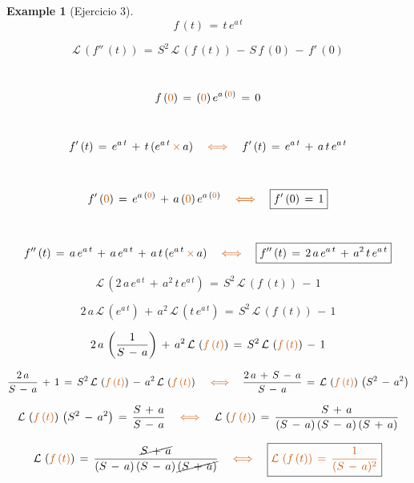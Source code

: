 \documentclass[a4paper,11pt,openany]{book}
\newtheorem{exmp}{Example}[section]
\begin{document}
\begin{exmp}[Ejercicio 3]
 
$$f\,(t)\,=\,t\,e^{a\,t}$$
 
 
$$\boxed{\mathcal{L}\,\left(f''\,(t) \right)\,=\,S^{2}\,\mathcal{L}\,\left(f\,(t) \right)\,-\,S\,f\,(0)\,-\,f'\,(0)}$$
 
\textcolor{burntorange}{}\, $$f\,(\textcolor{burntorange}{0})\,=\,(\textcolor{burntorange}{0})\,e^{a\,(\textcolor{burntorange}{0})}\,=\,0$$
 
\textcolor{burntorange}{}\, $$f'\,(t)\,=\,e^{a\,t}\,+\,t\,(e^{a\,t}\,\textcolor{burntorange}{\times}\,a) \quad \textcolor{burntorange}{\iff} \quad f'\,(t)\,=\,e^{a\,t}\,+\,a\,t\,e^{a\,t}$$
 
\textcolor{burntorange}{}\, $$f'\,(\textcolor{burntorange}{0})\,=\,e^{a\,(\textcolor{burntorange}{0})}\,+\,a\,(\textcolor{burntorange}{0})\,e^{a\,(\textcolor{burntorange}{0})} \quad \textcolor{burntorange}{\iff} \quad \boxed{f'\,(0)\,=\,1}$$
 
\textcolor{burntorange}{}\, $$f''\,(t)\,=\,a\,e^{a\,t}\,+\,a\,e^{a\,t}\,+\,a\,t\,(e^{a\,t}\,\textcolor{burntorange}{\times}\,a) \quad \textcolor{burntorange}{\iff} \quad \boxed{f''\,(t)\,=\,2\,a\,e^{a\,t}\,+\,a^{2}\,t\,e^{a\,t}}$$
 
$$\mathcal{L}\,\left(2\,a\,e^{a\,t}\,+\,a^{2}\,t\,e^{a\,t} \right)\,=\,S^{2}\,\mathcal{L}\,\left(f\,(t) \right)\,-\,1$$
 
$$2\,a\,\mathcal{L}\,\left(e^{a\,t} \right)\,+\,a^{2}\,\mathcal{L}\,\left(t\,e^{a\,t} \right)\,=\,S^{2}\,\mathcal{L}\,\left(f\,(t) \right)\,-\,1$$
 
$$2\,a\,\left(\dfrac{1}{S\,-\,a} \right)\,+\,a^{2}\,\mathcal{L}\,\left(\textcolor{burntorange}{f\,(t) } \right)\,=\,S^{2}\,\mathcal{L}\,\left(\textcolor{burntorange}{f\,(t) } \right)\,-\,1 $$
 
$$\dfrac{2\,a}{S\,-\,a}\,+\,1\,=\,S^{2}\,\mathcal{L}\,\left(\textcolor{burntorange}{f\,(t) } \right)\,-\,a^{2}\,\mathcal{L}\,\left(\textcolor{burntorange}{f\,(t) } \right) \quad \textcolor{burntorange}{\iff} \quad \dfrac{2\,a\,+\,S\,-\,a}{S\,-\,a}\,=\,\mathcal{L}\,\left(\textcolor{burntorange}{f\,(t) } \right)\,\left(S^{2}\,-\,a^{2} \right)$$
 
$$\mathcal{L}\,\left(\textcolor{burntorange}{f\,(t) } \right)\,\left(S^{2}\,-\,a^{2} \right)\,=\,\dfrac{S\,+\,a}{S\,-\,a} \quad \textcolor{burntorange}{\iff} \quad \mathcal{L}\,\left(\textcolor{burntorange}{f\,(t) } \right)\,=\,\dfrac{S\,+\,a}{(S\,-\,a)\,(S\,-\,a)\,(S\,+\,a) }$$
 
$$\mathcal{L}\,\left(\textcolor{burntorange}{f\,(t) } \right)\,=\,\dfrac{\cancel{S\,+\,a}}{(S\,-\,a)\,(S\,-\,a)\,\cancel{(S\,+\,a)} } \quad \textcolor{burntorange}{\iff} \quad \boxed{\textcolor{burntorange}{\mathcal{L}\,\left(\textcolor{burntorange}{f\,(t) } \right)\,=\,\dfrac{1}{(S\,-\,a)^{2}} } }$$
 
\end{exmp}
 
\end{document}
